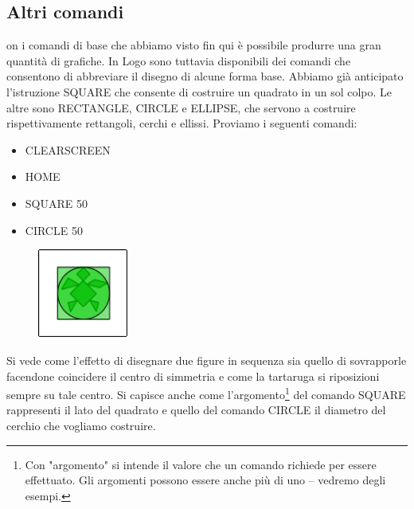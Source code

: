\subsection{Altri comandi}

on i comandi di base che abbiamo visto fin qui è possibile produrre una gran quantità di grafiche. In Logo sono tuttavia disponibili dei comandi che consentono di abbreviare il disegno di alcune forma base. Abbiamo già anticipato l'istruzione SQUARE che consente di costruire un quadrato in un sol colpo. Le altre sono RECTANGLE, CIRCLE e ELLIPSE, che servono a costruire rispettivamente rettangoli, cerchi e ellissi.
Proviamo i seguenti comandi:

\vskip 1cm

\begin{scriptsize}
\begin{scriptsize}
\begin{minipage}{0.40\textwidth}
\begin{itemize}[itemsep=-3pt,parsep=2pt]
\item[] CLEARSCREEN
\item[] HOME
\item[] SQUARE 50                               
\item[] CIRCLE 50                                       
\end{itemize}
\end{minipage}
\end{scriptsize}
\end{scriptsize}
\begin{minipage}{0.4\textwidth}
\begin{figure}[H]
   \includegraphics[width=3.0cm,trim=4 4 8 4,clip]{./images/disegnare/disegnare-20.png}
   \label{dis-19}
\end{figure}
\end{minipage} \hfill

\vskip 1cm

Si vede come l'effetto di disegnare due figure in sequenza sia quello di sovrapporle facendone coincidere il centro di simmetria e come la tartaruga si riposizioni sempre su tale centro. Si capisce anche come l'argomento\footnote{Con "argomento" si intende il valore che un comando richiede per essere effettuato. Gli argomenti possono essere anche più di uno – vedremo degli esempi. } del comando SQUARE rappresenti il lato del quadrato e quello del comando CIRCLE il diametro del cerchio che vogliamo costruire.

